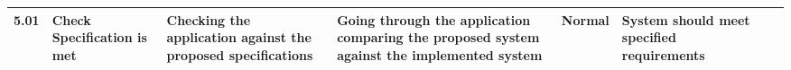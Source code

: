 \begin{landscape}
\begin{center}
\begin{longtable}{|p{1.5cm}|p{2.5cm}|p{2.5cm}|p{2cm}|p{2cm}|p{2cm}|p{2cm}|p{2cm}|}
5.01 & Check Specification is met & Checking the application against the proposed specifications & Going through the application comparing the proposed system against the implemented system & Normal & System should meet specified requirements & & \\ \hline 
    \end{longtable}
\end{center}
\end{landscape}
